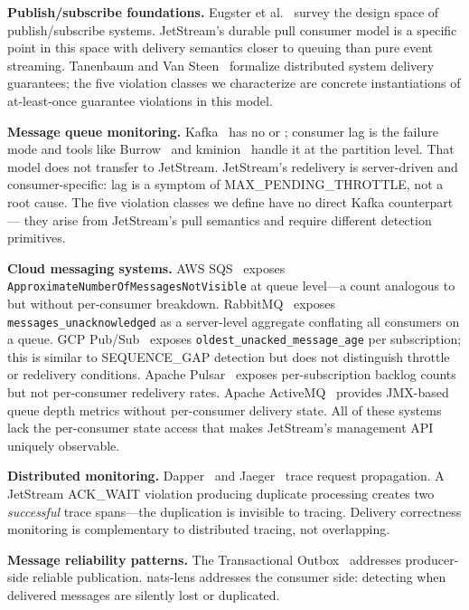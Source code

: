 \documentclass[journal]{IEEEtran}
\begin{document}
\textbf{Publish/subscribe foundations.}
Eugster et al.~\cite{pubsub-survey} survey the design space of publish/subscribe
systems. JetStream's durable pull consumer model is a specific point in this
space with delivery semantics closer to queuing than pure event streaming.
Tanenbaum and Van Steen~\cite{tanenbaum} formalize distributed system
delivery guarantees; the five violation classes we characterize are concrete
instantiations of at-least-once guarantee violations in this model.

\textbf{Message queue monitoring.}
Kafka~\cite{kafka} has no  or ;
consumer lag is the failure mode and tools like Burrow~\cite{burrow} and
kminion~\cite{kminion} handle it at the partition level. That model does
not transfer to JetStream. JetStream's redelivery is server-driven and
consumer-specific: lag is a symptom of MAX\_PENDING\_THROTTLE, not a
root cause. The five violation classes we define have no direct Kafka
counterpart --- they arise from JetStream's pull semantics and require
different detection primitives.

\textbf{Cloud messaging systems.}
AWS SQS~\cite{awssqs} exposes \texttt{ApproximateNumberOfMessagesNotVisible}
at queue level---a count analogous to  but without
per-consumer breakdown. RabbitMQ~\cite{rabbitmq} exposes
\texttt{messages\_unacknowledged} as a server-level aggregate conflating
all consumers on a queue. GCP Pub/Sub~\cite{gcppubsub} exposes
\texttt{oldest\_unacked\_message\_age} per subscription; this is similar
to SEQUENCE\_GAP detection but does not distinguish throttle or redelivery
conditions. Apache Pulsar~\cite{pulsar} exposes per-subscription backlog
counts but not per-consumer redelivery rates. Apache ActiveMQ~\cite{activemq}
provides JMX-based queue depth metrics without per-consumer delivery state.
All of these systems lack the per-consumer state access that makes JetStream's
management API uniquely observable.

\textbf{Distributed monitoring.}
Dapper~\cite{dapper} and Jaeger~\cite{jaeger} trace request propagation.
A JetStream ACK\_WAIT violation producing duplicate processing creates two
\emph{successful} trace spans---the duplication is invisible to tracing.
Delivery correctness monitoring is complementary to distributed tracing,
not overlapping.

\textbf{Message reliability patterns.}
The Transactional Outbox~\cite{outbox} addresses producer-side reliable
publication. nats-lens addresses the consumer side: detecting when delivered
messages are silently lost or duplicated.
\end{document}
